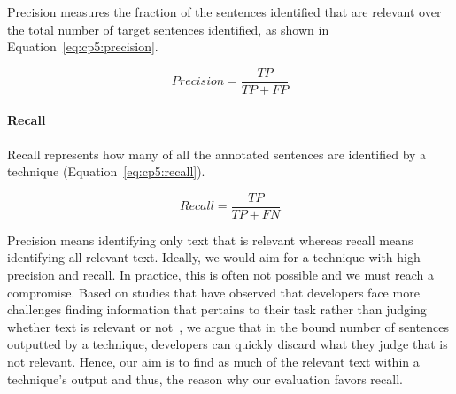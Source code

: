 Precision measures the fraction of the sentences identified that are relevant over the total number of target sentences identified, as shown in Equation~\ref{eq:cp5:precision}.



\begin{equation}
\label{eq:cp5:precision}    
    Precision = \frac{TP}{TP + FP}
\end{equation}



\paragraph{\textbf{Recall}} Recall represents how many of all the annotated sentences are identified by a technique (Equation~\ref{eq:cp5:recall}).


\begin{equation}
\label{eq:cp5:recall}        
    Recall = \frac{TP}{TP + FN}
\end{equation}



\medskip
Precision means identifying only text that is relevant whereas recall means identifying all relevant text.
Ideally, we would aim for a technique with high precision and recall. In practice, this is often not possible and we must reach a compromise.
Based on studies that have observed that developers face more challenges finding information that pertains to their task rather than judging whether text is relevant or not~\cite{Robillard2015, Maalej2013}, we argue that in the bound number of sentences outputted by a technique, developers can quickly discard what they judge that is not relevant. Hence, our aim is to find as much of the relevant text within a technique's output and thus, the reason why our evaluation favors recall.











